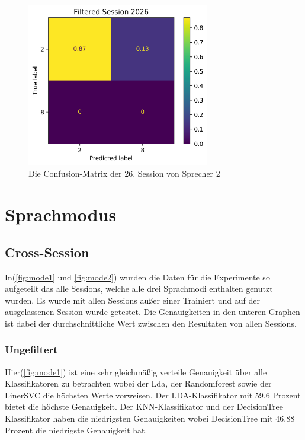 \begin{figure}[H]
  \centering
  \includegraphics[width=80mm ,scale=0.4]{userCrossSession_without29/Session 2026_without29.png}
  \caption{Die Confusion-Matrix der 26. Session von Sprecher 2}
  \label{fig:cnf7}
\end{figure}


\section{Sprachmodus}
\subsection{Cross-Session}
In(\ref{fig:mode1} und \ref{fig:mode2}) wurden die Daten für die Experimente so aufgeteilt das alle Sessions, welche alle drei Sprachmodi enthalten genutzt wurden. Es wurde mit allen Sessions außer einer Trainiert und auf der ausgelassenen Session wurde getestet. Die Genauigkeiten in den unteren Graphen ist dabei der durchschnittliche Wert zwischen den Resultaten von allen Sessions.

\subsubsection{Ungefiltert}
 Hier(\ref{fig:mode1}) ist eine sehr gleichmäßig verteile Genauigkeit über alle Klassifikatoren zu betrachten wobei der Lda, der Randomforest sowie der LinerSVC die höchsten Werte vorweisen. Der LDA-Klassifikator mit 59.6 Prozent bietet die höchste Genauigkeit. Der KNN-Klassifikator und der DecisionTree Klassifikator haben die niedrigsten Genauigkeiten wobei DecisionTree mit 46.88 Prozent die niedrigste Genauigkeit hat.

